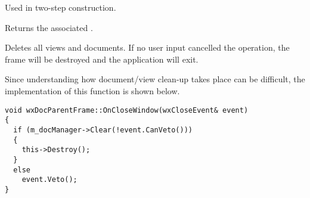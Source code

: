\label{wxdocparentframecreate}


Used in two-step construction.

\label{wxdocparentframegetdocumentmanager}


Returns the associated .



\label{wxdocparentframeonclosewindow}


Deletes all views and documents. If no user input cancelled the
operation, the frame will be destroyed and the application will exit.

Since understanding how document/view clean-up takes place can be difficult,
the implementation of this function is shown below.

\begin{verbatim}
void wxDocParentFrame::OnCloseWindow(wxCloseEvent& event)
{
  if (m_docManager->Clear(!event.CanVeto()))
  {
    this->Destroy();
  }
  else
    event.Veto();
}
\end{verbatim}

